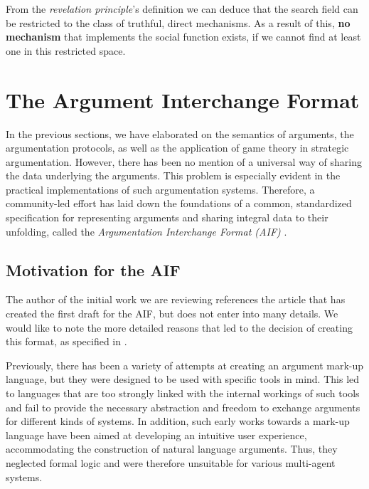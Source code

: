 \documentclass[12pt, a4paper]{article}
\begin{document}
From the \emph{revelation principle}'s definition we can deduce that the search
field can be restricted to the class of truthful, direct mechanisms. As a
result of this, \textbf{no mechanism} that implements the social function exists,
if we cannot find at least one in this restricted space.



\newpage

\section{The Argument Interchange Format}
In the previous sections, we have elaborated on the semantics of arguments, the argumentation protocols, as well as the application of game theory in strategic argumentation. However, there has been no mention of a universal way of sharing the data underlying the arguments. This problem is especially evident in the practical implementations of such argumentation systems. Therefore, a community-led effort has laid down the foundations of a common, standardized specification for representing arguments and sharing integral data to their unfolding, called the \emph{Argumentation Interchange Format (AIF)} \cite{aif}.

\subsection{Motivation for the AIF}
The author of the initial work we are reviewing references the article that has created the first draft for the AIF, but does not enter into many details. We would like to note the more detailed reasons that led to the decision of creating this format, as specified in \cite{aif}.

Previously, there has been a variety of attempts at creating an argument mark-up language, but they were designed to be used with specific tools in mind. This led to languages that are too strongly linked with the internal workings of such tools and fail to provide the necessary abstraction and freedom to exchange arguments for different kinds of systems. In addition, such early works towards a mark-up language have been aimed at developing an intuitive user experience, accommodating the construction of natural language arguments. Thus, they neglected formal logic and were therefore unsuitable for various multi-agent systems.
\end{document}
